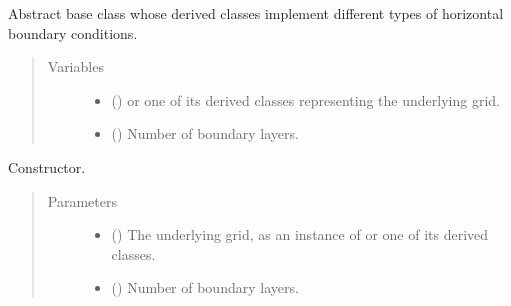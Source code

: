 \documentclass[letterpaper,10pt,english]{sphinxmanual}
\begin{document}
\begin{fulllineitems}
\label{\detokenize{api:tasmania.dycore.horizontal_boundary.HorizontalBoundary}}
Abstract base class whose derived classes implement different types of horizontal boundary conditions.
\begin{quote}\begin{description}
\item[{Variables}] \leavevmode\begin{itemize}
\item {} 
 () \textendash{} {\hyperref[\detokenize{api:tasmania.grids.grid_xyz.GridXYZ}]{}} or one of its derived classes representing the underlying grid.

\item {} 
{\hyperref[\detokenize{api:tasmania.dycore.prognostic_isentropic.PrognosticIsentropic.nb}]{}} () \textendash{} Number of boundary layers.

\end{itemize}

\end{description}\end{quote}

\begin{fulllineitems}
\label{\detokenize{api:tasmania.dycore.horizontal_boundary.HorizontalBoundary.__init__}}
Constructor.
\begin{quote}\begin{description}
\item[{Parameters}] \leavevmode\begin{itemize}
\item {} 
 () \textendash{} The underlying grid, as an instance of {\hyperref[\detokenize{api:tasmania.grids.grid_xyz.GridXYZ}]{}} or one of its derived classes.

\item {} 
 () \textendash{} Number of boundary layers.


\end{itemize}
\end{description}
\end{quote}
\end{fulllineitems}
\end{fulllineitems}
\end{document}
